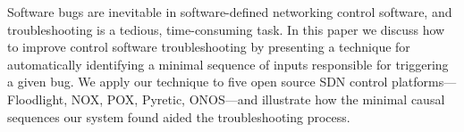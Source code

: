 Software bugs are inevitable in software-defined networking control software,
and troubleshooting
is a tedious, time-consuming task. In this paper we discuss how to improve
control software troubleshooting by presenting a technique
for automatically identifying
a minimal sequence of inputs responsible for triggering a given bug.
We apply our technique to five open source SDN control
platforms---Floodlight, NOX, POX, Pyretic, ONOS---and
illustrate how the minimal causal sequences our system found aided the
troubleshooting process.
